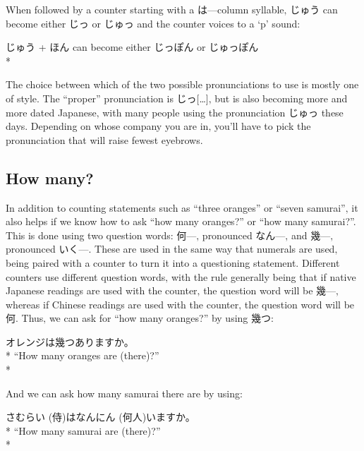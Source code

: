 \documentclass[11pt, b5paper, twoside, openright, onecolumn]{book}
\makeatletter
\newcommand*{\rubystack}[2]{{\relscale{0.5}%
  \begin{tabular}[b]{@{}c@{}}%
    {#1}\\%
   {\textscale{2}{#2}}%
  \end{tabular}}%
}
\DeclareRobustCommand*{\ruby}[2]{%
  \mbox{%
    \setlength{\parskip}{0ex}%
    \BeginAccSupp{method=pdfstringdef,ActualText={#1}}%
      \rubystack{\phantom{#2}}{#1}%
      \llap{%
        \rubystack{#2}{\phantom{#1}}%
      }%
    \EndAccSupp{}%
  }%
}
\renewcommand*{\ruby}[2]{#2 (#1)}%
\newenvironment{exampleblock}{
\setlength{\parindent}{0.6in}
\begin{minipage}[t]{\dimexpr\textwidth-\parindent}}
{\end{minipage}}
\makeatother
\begin{document}
When followed by a counter starting with a は—column syllable‚ じゅう can become either じっ or じゅっ and the counter voices to a ‘p’ sound:

\vspace{0.4cm}
\begin{exampleblock}
じゅう + ほん can become either じっぽん or じゅっぽん \\* 
\end{exampleblock}
\vspace{0.2cm}

The choice between which of the two possible pronunciations to use is mostly one of style. The “proper” pronunciation is じっ[…]‚ but is also becoming more and more dated Japanese‚ with many people using the pronunciation じゅっ these days. Depending on whose company you are in‚ you’ll have to pick the pronunciation that will raise fewest eyebrows.

\subsection{How many?}

In addition to counting statements such as “three oranges” or “seven samurai”‚ it also helps if we know how to ask “how many oranges?” or “how many samurai?”. This is done using two question words: 何—‚ pronounced なん—‚ and 幾—‚ pronounced いく—. These are used in the same way that numerals are used‚ being paired with a counter to turn it into a questioning statement. Different counters use different question words‚ with the rule generally being that if native Japanese readings are used with the counter‚ the question word will be 幾—‚ whereas if Chinese readings are used with the counter‚ the question word will be 何. Thus‚ we can ask for “how many oranges?” by using 幾つ:

\vspace{0.4cm}
\begin{exampleblock}
オレンジは幾つありますか。 \\* 
“How many oranges are (there)?” \\* 
\end{exampleblock}
\vspace{0.2cm}

And we can ask how many samurai there are by using:

\vspace{0.4cm}
\begin{exampleblock}
\ruby{侍}{さむらい}は\ruby{何人}{なんにん}いますか。 \\* 
“How many samurai are (there)?” \\* 
\end{exampleblock}
\vspace{0.2cm}
\end{document}
